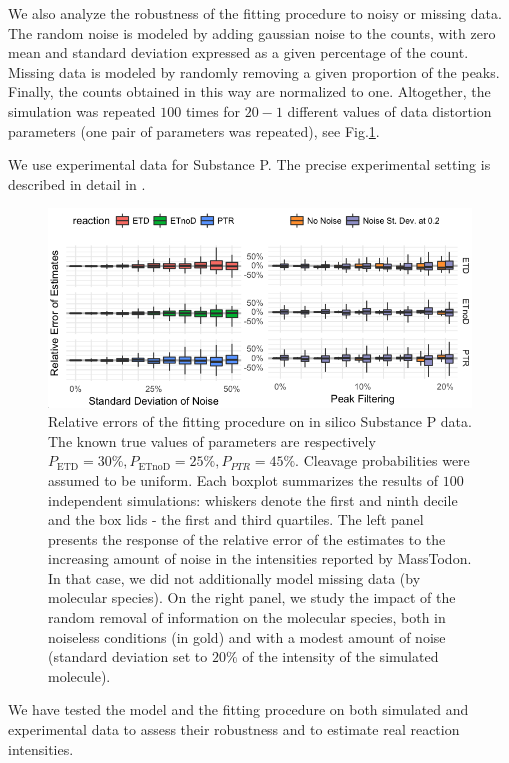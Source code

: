 \documentclass{llncs}
\begin{document}
We also analyze the robustness of the fitting procedure to noisy or missing data. The random noise is modeled by adding gaussian noise to the counts, with zero mean and standard deviation expressed as a given percentage of the count. Missing data is modeled by randomly removing a given proportion of the peaks. Finally, the counts obtained in this way are normalized to one. Altogether, the simulation was repeated $100$ times for $20-1$ different values of data distortion parameters (one pair of parameters was repeated), see Fig.\ref{fig::kokos}.

We use experimental data for Substance P. The precise experimental setting is described in detail in \cite{Lermyte2015-eb}.
\begin{figure}[h]
        \center
        \includegraphics[width=.9\textwidth]{kokos.png}
        \caption{ Relative errors of the fitting procedure on in silico Substance P data. The known true values of parameters are respectively $P_\text{ETD}=30\%, P_\text{ETnoD}= 25\%, P_{PTR}= 45\%$. Cleavage probabilities were assumed to be uniform. Each boxplot summarizes the results of $100$ independent simulations: whiskers denote the first and ninth decile and the box lids - the first and third quartiles. The left panel presents the response of the relative error of the estimates to the increasing amount of noise in the intensities reported by {\sc MassTodon}. In that case, we did not additionally model missing data (by molecular species). On the right panel, we study the impact of the random removal of information on the molecular species, both in noiseless conditions (in gold) and with a modest amount of noise (standard deviation set to $20\%$ of the intensity of the simulated molecule).
        }\label{fig::kokos}
\end{figure}
We have tested the model and the fitting procedure on both simulated and experimental data to assess their robustness and to estimate real reaction intensities.
\end{document}
